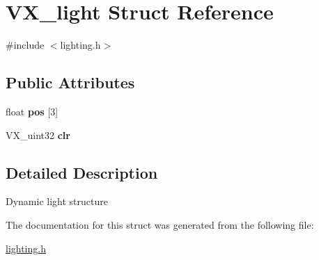 \hypertarget{structVX__light}{\section{V\-X\-\_\-light Struct Reference}
\label{structVX__light}
}


{\ttfamily \#include $<$lighting.\-h$>$}

\subsection*{Public Attributes}
\begin{DoxyCompactItemize}
\item 
\hypertarget{structVX__light_ac64e608f734473b0a1144df753536657}{float {\bfseries pos} \mbox{[}3\mbox{]}}\label{structVX__light_ac64e608f734473b0a1144df753536657}

\item 
\hypertarget{structVX__light_a10b8598d54c4c0f50bce6ec99c157ac3}{V\-X\-\_\-uint32 {\bfseries clr}}\label{structVX__light_a10b8598d54c4c0f50bce6ec99c157ac3}

\end{DoxyCompactItemize}


\subsection{Detailed Description}
Dynamic light structure 

The documentation for this struct was generated from the following file\-:\begin{DoxyCompactItemize}
\item 
\hyperlink{lighting_8h}{lighting.\-h}\end{DoxyCompactItemize}
